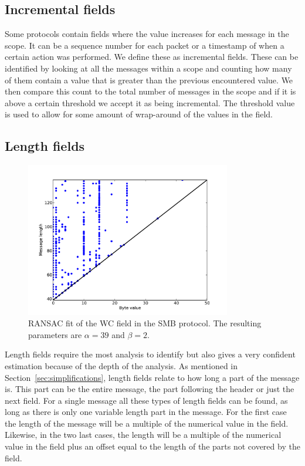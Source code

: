 \documentclass[a4paper]{report}
\begin{document}
\newpage

\subsection{Incremental fields}
Some protocols contain fields where the value increases for each message in the
scope. It can be a sequence number for each packet or a timestamp of when a
certain action was performed. We define these as incremental fields. These can
be identified by looking at all the messages within a scope and counting how
many of them contain a value that is greater than the previous encountered
value. We then compare this count to the total number of messages in the scope
and if it is above a certain threshold we accept it as being incremental. The
threshold value is used to allow for some amount of wrap-around of the values
in the field.

\subsection{Length fields}
\label{sec:length}

\begin{figure}[h]
    \centering
    \includegraphics[width=0.8\textwidth]{img/length}
    \captionsetup{width=0.8\textwidth}
    \caption{RANSAC fit of the WC field in the SMB protocol. The resulting
    parameters are $\alpha = 39$ and $\beta = 2$.}
    \label{fig:length}
\end{figure}

Length fields require the most analysis to identify but also gives a very
confident estimation because of the depth of the analysis. As mentioned in
Section~\ref{sec:simplifications}, length fields relate to how long a part of
the message is. This part can be the entire message, the part following the
header or just the next field. For a single message all these types of length
fields can be found, as long as there is only one variable length part in the
message. For the first case the length of the message will be a multiple of the
numerical value in the field. Likewise, in the two last cases, the length will
be a multiple of the numerical value in the field plus an offset equal to the
length of the parts not covered by the field.
\end{document}
